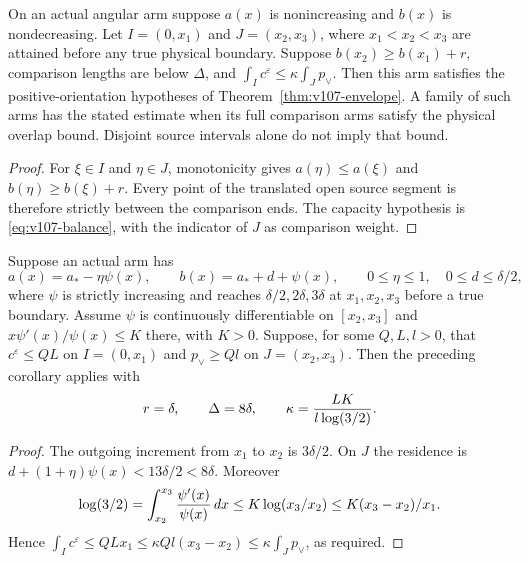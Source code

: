 \begin{corollary}\label{cor:v107-nested}
On an actual angular arm suppose $a(x)$ is nonincreasing and $b(x)$
is nondecreasing. Let $I=(0,x_1)$ and $J=(x_2,x_3)$, where
$x_1<x_2<x_3$ are attained before any true physical boundary.
Suppose $b(x_2)\ge b(x_1)+r$, comparison lengths are below $\Delta$,
and $\int_Ic^\varepsilon\le\kappa\int_Jp_\vee$.
Then this arm satisfies the positive-orientation hypotheses of
Theorem~\ref{thm:v107-envelope}. A family of such arms has the
stated estimate when its full comparison arms satisfy the physical
overlap bound. Disjoint source intervals alone do not imply that bound.
\end{corollary}
\begin{proof}
For $\xi\in I$ and $\eta\in J$, monotonicity gives
$a(\eta)\le a(\xi)$ and $b(\eta)\ge b(\xi)+r$.
Every point of the translated open source segment is therefore
strictly between the comparison ends. The capacity hypothesis is
\eqref{eq:v107-balance}, with the indicator of $J$ as comparison weight.
\end{proof}

\begin{proposition}
\label{prop:v107-drifting}
Suppose an actual arm has
\[
 a(x)=a_*-\eta\psi(x),\qquad b(x)=a_*+d+\psi(x),\qquad
 0\le\eta\le1,\quad0\le d\le\delta/2,
\]
where $\psi$ is strictly increasing and reaches $\delta/2,2\delta,3\delta$
at $x_1,x_2,x_3$ before a true boundary. Assume $\psi$ is
continuously differentiable on $[x_2,x_3]$ and
$x\psi'(x)/\psi(x)\le K$ there, with $K>0$.
Suppose, for some $Q,L,l>0$, that $c^\varepsilon\le QL$ on $I=(0,x_1)$
and $p_\vee\ge Ql$ on $J=(x_2,x_3)$. Then the preceding corollary applies
with
\begin{equation}\label{eq:v107-drifting-cost}
 r=\delta,\qquad\Delta=8\delta,\qquad
 \kappa={LK\over l\log(3/2)}.
\end{equation}
\end{proposition}
\begin{proof}
The outgoing increment from $x_1$ to $x_2$ is $3\delta/2$.
On $J$ the residence is $d+(1+\eta)\psi(x)<13\delta/2<8\delta$.
Moreover
\[
 \log(3/2)=\int_{x_2}^{x_3}{\psi'(x)\over\psi(x)}\,dx
 \le K\log(x_3/x_2)
 \le K(x_3-x_2)/x_1.
\]
Hence $\int_Ic^\varepsilon\le QLx_1\le\kappa Ql(x_3-x_2)
\le\kappa\int_Jp_\vee$, as required.
\end{proof}

